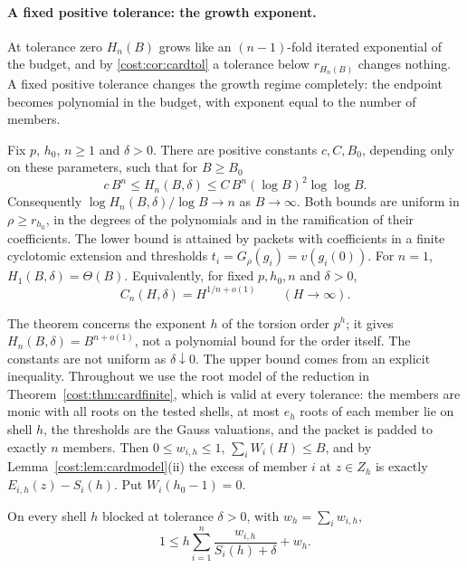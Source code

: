 \paragraph{A fixed positive tolerance: the growth exponent.}
At tolerance zero $H_n(B)$ grows like an $(n-1)$-fold iterated exponential of the budget, and
by \cref{cost:cor:cardtol} a tolerance below $r_{H_n(B)}$ changes nothing. A fixed positive
tolerance changes the growth regime completely: the endpoint becomes polynomial in the
budget, with exponent equal to the number of members.

\begin{theorem}\label{tors:thm:cardpos}
Fix $p$, $h_0$, $n\ge1$ and $\delta>0$. There are positive constants $c,C,B_0$, depending
only on these parameters, such that for $B\ge B_0$
\[
 c\,B^n\le H_n(B,\delta)\le C\,B^n(\log B)^2\log\log B .
\]
Consequently $\log H_n(B,\delta)/\log B\to n$ as $B\to\infty$. Both bounds are uniform in
$\rho\ge r_{h_0}$, in the degrees of the polynomials and in the ramification of their
coefficients. The lower bound is attained by packets with coefficients in a finite
cyclotomic extension and thresholds $t_i=G_\rho(g_i)=v(g_i(0))$. For $n=1$,
$H_1(B,\delta)=\Theta(B)$. Equivalently, for fixed $p,h_0,n$ and $\delta>0$,
\[
 C_n(H,\delta)=H^{1/n+o(1)}\qquad(H\to\infty).
\]
\end{theorem}

The theorem concerns the exponent $h$ of the torsion order $p^h$; it gives
$H_n(B,\delta)=B^{n+o(1)}$, not a polynomial bound for the order itself. The constants are
not uniform as $\delta\downarrow0$. The upper bound comes from an explicit inequality.
Throughout we use the root model of the reduction in Theorem~\ref{cost:thm:cardfinite},
which is valid at every tolerance: the members are monic with all roots on the tested
shells, at most $e_h$ roots of each member lie on shell $h$, the thresholds are the Gauss
valuations, and the packet is padded to exactly $n$ members. Then $0\le w_{i,h}\le1$,
$\sum_iW_i(H)\le B$, and by Lemma~\ref{cost:lem:cardmodel}(ii) the excess of member $i$ at
$z\in Z_h$ is exactly $E_{i,h}(z)-S_i(h)$. Put $W_i(h_0-1)=0$.

\begin{lemma}\label{tors:lem:shifted}
On every shell $h$ blocked at tolerance $\delta>0$, with $w_h=\sum_iw_{i,h}$,
\begin{equation}\label{tors:eq:shifted}
 1\le h\sum_{i=1}^n\frac{w_{i,h}}{S_i(h)+\delta}+w_h .
\end{equation}
\end{lemma}

